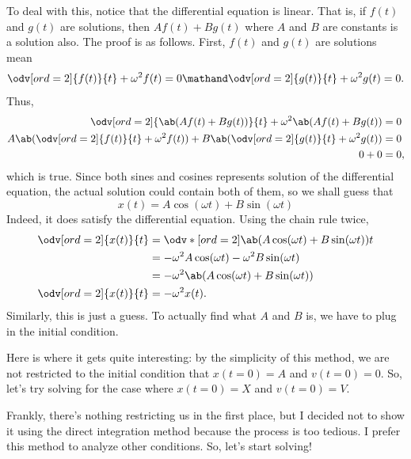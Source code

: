To deal with this, notice that the differential equation is linear. That is, if $f(t)$ and $g(t)$ are solutions, then $Af(t) + Bg(t)$ where $A$ and $B$ are constants is a solution also. The proof is as follows. First, $f(t)$ and $g(t)$ are solutions mean
\begin{equation}
	\odv[ord = 2]{f(t)}{t} + \omega^2f(t) = 0 \mathand \odv[ord = 2]{g(t)}{t} + \omega^2g(t) = 0.
\end{equation}
Thus,
\begin{align}
	\odv[ord = 2]{\ab(Af(t) + Bg(t))}{t} + \omega^2\ab(Af(t) + Bg(t))                         & = 0  \\
	A\ab(\odv[ord = 2]{f(t)}{t} + \omega^2f(t)) + B\ab(\odv[ord = 2]{g(t)}{t} + \omega^2g(t)) & = 0  \\
	0 + 0                                                                                     & = 0,
\end{align}
which is true. Since both sines and cosines represents solution of the differential equation, the actual solution could contain both of them, so we shall guess that
\begin{equation}
	x(t) = A\cos(\omega t) + B\sin(\omega t)
\end{equation}
Indeed, it does satisfy the differential equation. Using the chain rule twice,
\begin{align}
	\odv[ord = 2]{x(t)}{t}
	                       & = \odv*[ord = 2]{\ab(A\cos(\omega t) + B\sin(\omega t))}{t}                                        \\
	                       & = -\omega^2A\cos(\omega t) - \omega^2B\sin(\omega t)                                               \\
	                       & = -\omega^2\ab(A\cos(\omega t) + B\sin(\omega t)) \label{eq:harmonic-oscillator-ansatz-derivative} \\
	\odv[ord = 2]{x(t)}{t} & = -\omega^2x(t).
\end{align}
Similarly, this is just a guess. To actually find what $A$ and $B$ is, we have to plug in the initial condition.

Here is where it gets quite interesting: by the simplicity of this method, we are not restricted to the initial condition that $x(t = 0) = A$ and $v(t = 0) = 0$. So, let's try solving for the case where $x(t = 0) = X$ and $v(t = 0) = V$.

Frankly, there's nothing restricting us in the first place, but I decided not to show it using the direct integration method because the process is too tedious. I prefer this method to analyze other conditions. So, let's start solving!

